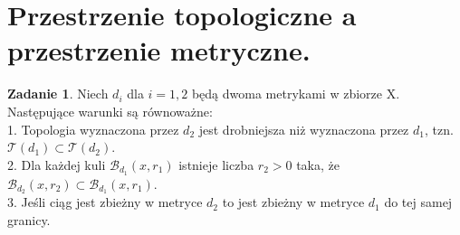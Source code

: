\documentclass{article}
\theoremstyle{definition}%
\theoremstyle{theorem}
\newtheorem{zad}{Zadanie}
\begin{document}
	\section{Przestrzenie topologiczne a przestrzenie metryczne.}
	\begin{zad}
		Niech $d_i$ dla $i = 1,2$ będą dwoma metrykami w zbiorze X. Następujące warunki są równoważne:\\
		1. Topologia wyznaczona przez $d_2$ jest drobniejsza niż wyznaczona przez $d_1$, tzn. $\mathcal{T}(d_1)\subset\mathcal{T}(d_2)$.\\
		2. Dla każdej kuli $\mathcal{B}_{d_1}(x,r_1)$ istnieje liczba $r_2>0$ taka, że $\mathcal{B}_{d_2}(x,r_2)\subset\mathcal{B}_{d_1}(x,r_1)$.\\
		3. Jeśli ciąg jest zbieżny w metryce $d_2$ to jest zbieżny w metryce $d_1$ do tej samej granicy.
			\end{zad}
\end{document}
